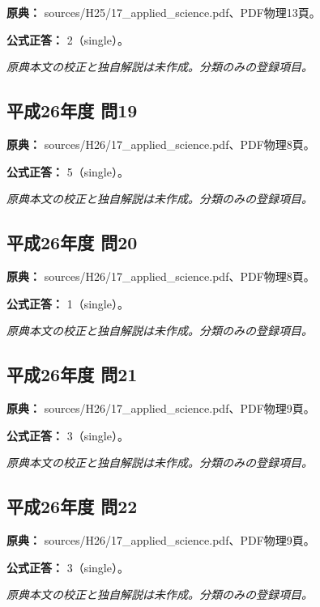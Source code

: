 \noindent\textbf{原典：} sources/H25/17\_applied\_science.pdf、PDF物理13頁。

\textbf{公式正答：} 2（single）。

\par\textit{原典本文の校正と独自解説は未作成。分類のみの登録項目。}

\subsection{平成26年度 問19}
\label{q:h26-reg-applied-19}

\noindent\textbf{原典：} sources/H26/17\_applied\_science.pdf、PDF物理8頁。

\textbf{公式正答：} 5（single）。

\par\textit{原典本文の校正と独自解説は未作成。分類のみの登録項目。}

\subsection{平成26年度 問20}
\label{q:h26-reg-applied-20}

\noindent\textbf{原典：} sources/H26/17\_applied\_science.pdf、PDF物理8頁。

\textbf{公式正答：} 1（single）。

\par\textit{原典本文の校正と独自解説は未作成。分類のみの登録項目。}

\subsection{平成26年度 問21}
\label{q:h26-reg-applied-21}

\noindent\textbf{原典：} sources/H26/17\_applied\_science.pdf、PDF物理9頁。

\textbf{公式正答：} 3（single）。

\par\textit{原典本文の校正と独自解説は未作成。分類のみの登録項目。}

\subsection{平成26年度 問22}
\label{q:h26-reg-applied-22}

\noindent\textbf{原典：} sources/H26/17\_applied\_science.pdf、PDF物理9頁。

\textbf{公式正答：} 3（single）。

\par\textit{原典本文の校正と独自解説は未作成。分類のみの登録項目。}

